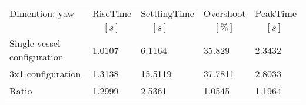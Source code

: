 \begin{tabular}{lllll}
 Dimention: yaw & RiseTime & SettlingTime & Overshoot & PeakTime \\ 
 & $\;\;\;\;[s]$ & $\;\;\;\;[s]$ & $\;\;\;\;[\%]$ & $\;\;\;\;[s]$ \\ 
\hline 
Single vessel configuration & 1.0107 & 6.1164 & 35.829 & 2.3432 \\ 
3x1 configuration & 1.3138 & 15.5119 & 37.7811 & 2.8033 \\[10pt] \hline
Ratio & 1.2999 & 2.5361 & 1.0545 & 1.1964 \\ 
\end{tabular}